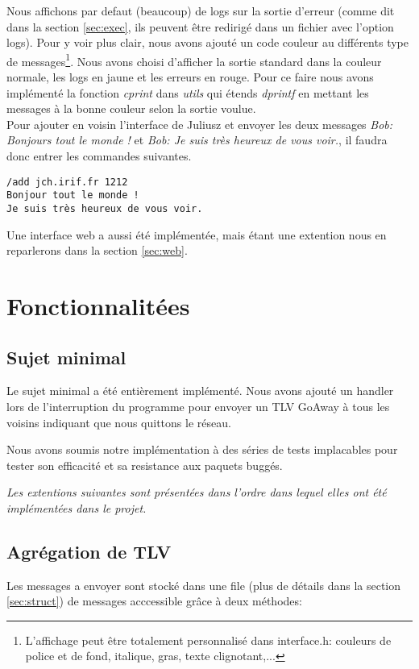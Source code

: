 \documentclass[a4paper,10pt]{article} %
\begin{document}
Nous affichons par defaut (beaucoup) de logs sur la sortie d'erreur (comme dit dans la section \ref{sec:exec}, ils peuvent être redirigé dans un fichier avec l'option \textrm{logs}). Pour y voir plus clair, nous avons ajouté un code couleur au différents type de messages\footnote{L'affichage peut être totalement personnalisé dans \textrm{interface.h}: couleurs de police et de fond, italique, gras, texte clignotant,...}. Nous avons choisi d'afficher la sortie standard dans la couleur normale, les logs en jaune et les erreurs en rouge. Pour ce faire nous avons implémenté la fonction \textit{cprint} dans \textit{utils} qui étends \textit{dprintf} en mettant les messages à la bonne couleur selon la sortie voulue.\\

Pour ajouter en voisin l'interface de Juliusz et envoyer les deux messages \textit{Bob: Bonjours tout le monde !} et \textit{Bob: Je suis très heureux de vous voir.}, il faudra donc entrer les commandes suivantes.

\begin{verbatim}
/add jch.irif.fr 1212
Bonjour tout le monde !
Je suis très heureux de vous voir.
\end{verbatim}

Une interface web a aussi été implémentée, mais étant une extention nous en reparlerons dans la section \ref{sec:web}.

\section{Fonctionnalitées}

\subsection{Sujet minimal}
Le sujet minimal a été entièrement implémenté.
Nous avons ajouté un handler lors de l'interruption du programme pour envoyer un TLV GoAway à tous les voisins indiquant que nous quittons le réseau.

Nous avons soumis notre implémentation à des séries de tests implacables pour tester son efficacité et sa resistance aux paquets buggés.


\textit{Les extentions suivantes sont présentées dans l'ordre dans lequel elles ont été implémentées dans le projet.}

\subsection{Agrégation de TLV\label{sec:agrega}}
Les messages a envoyer sont stocké dans une file (plus de détails dans la section \ref{sec:struct}) de messages acccessible grâce à deux méthodes:
\end{document}
